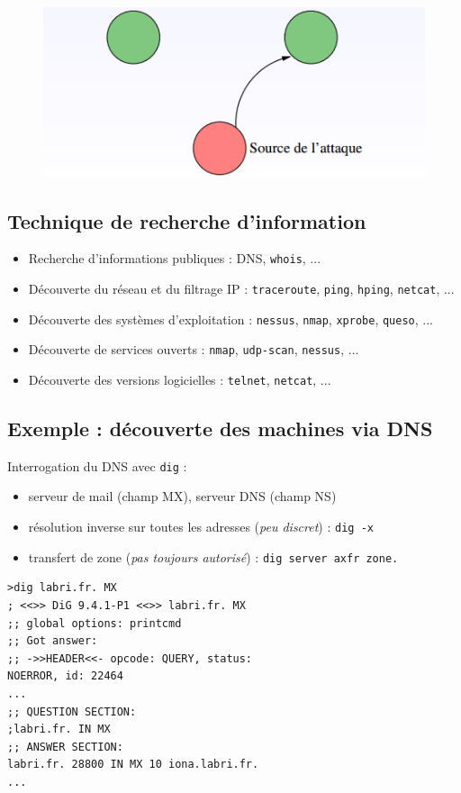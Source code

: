 \documentclass[journal, a4paper]{IEEEtran}
\begin{document}
		\begin{figure}[!hbt]
			\begin{center}
				\includegraphics[width=\columnwidth]{img/but_fab.png}
				\label{fig:but_fab}
			\end{center}
		\end{figure}
		
	\subsection{Technique de recherche d'information}
		\begin{itemize}
			\item Recherche d'informations publiques : DNS, \verb|whois|, ...
			\item Découverte du réseau et du filtrage IP : \verb|traceroute|, \verb|ping|, \verb|hping|, \verb|netcat|, ...
			\item Découverte des systèmes d'exploitation : \verb|nessus|, \verb|nmap|, \verb|xprobe|, \verb|queso|, ...
			\item Découverte de services ouverts : \verb|nmap|, \verb|udp-scan|, \verb|nessus|, ...
			\item Découverte des versions logicielles : \verb|telnet|, \verb|netcat|, ...
		\end{itemize}
		
	\subsection{Exemple : découverte des machines via DNS}
		Interrogation du DNS avec \verb$dig$ :
		\begin{itemize}
			\item serveur de mail (champ MX), serveur DNS (champ NS)
			\item résolution inverse sur toutes les adresses (\textsl{peu discret}) : \verb$dig -x$
			\item transfert de zone (\textsl{pas toujours autorisé}) : \verb$dig server axfr zone.$
		\end{itemize}
		\begin{Verbatim}[fontsize=\small]
>dig labri.fr. MX
; <<>> DiG 9.4.1-P1 <<>> labri.fr. MX
;; global options: printcmd
;; Got answer:
;; ->>HEADER<<- opcode: QUERY, status:
NOERROR, id: 22464
...
;; QUESTION SECTION:
;labri.fr. IN MX
;; ANSWER SECTION:
labri.fr. 28800 IN MX 10 iona.labri.fr.
...
		\end{Verbatim}
		
		
		

	
\end{document}
